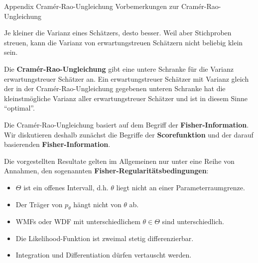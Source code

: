 \documentclass[
  8pt,
  ignorenonframetext,
]{beamer}
\providecommand{\tightlist}{%
  \setlength{\itemsep}{0pt}\setlength{\parskip}{0pt}}
\begin{document}
\begin{frame}{Appendix \textbar{} Cramér-Rao-Ungleichung}
\protect\hypertarget{appendix-cramuxe9r-rao-ungleichung}{}
Vorbemerkungen zur Cramér-Rao-Ungleichung

\small

Je kleiner die Varianz eines Schätzers, desto besser. Weil aber
Stichproben streuen, kann die Varianz von erwartungstreuen Schätzern
nicht beliebig klein sein. \vspace{2mm}

Die \textbf{Cramér-Rao-Ungleichung} gibt eine untere Schranke für die
Varianz erwartungstreuer Schätzer an. Ein erwartungstreuer Schätzer mit
Varianz gleich der in der Cramér-Rao-Ungleichung gegebenen unteren
Schranke hat die kleinstmögliche Varianz aller erwartungstreuer Schätzer
und ist in diesem Sinne ``optimal''. \vspace{2mm}

Die Cramér-Rao-Ungleichung basiert auf dem Begriff der
\textbf{Fisher-Information}. Wir diskutieren deshalb zunächst die
Begriffe der \textbf{Scorefunktion} und der darauf basierenden
\textbf{Fisher-Information}. \vspace{2mm}

Die vorgestellten Resultate gelten im Allgemeinen nur unter eine Reihe
von Annahmen, den sogenannten \textbf{Fisher-Regularitätsbedingungen}:

\footnotesize

\begin{itemize}
\tightlist
\item
  \(\Theta\) ist ein offenes Intervall, d.h. \(\theta\) liegt nicht an
  einer Parameterraumgrenze.
\item
  Der Träger von \(p_\theta\) hängt nicht von \(\theta\) ab.
\item
  WMFs oder WDF mit unterschiedlichem \(\theta \in \Theta\) sind
  unterschiedlich.
\item
  Die Likelihood-Funktion ist zweimal stetig differenzierbar.
\item
  Integration und Differentiation dürfen vertauscht werden.
\end{itemize}
\end{frame}
\end{document}
